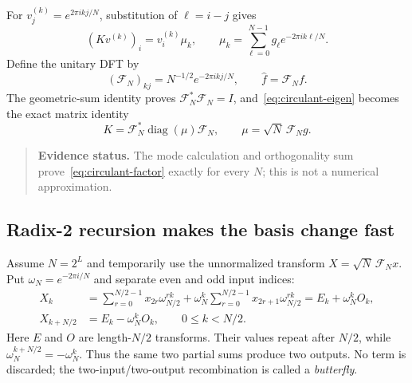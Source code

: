 \documentclass[11pt,a4paper]{article}
\newenvironment{evidence}{\begin{quote}\small\color{muted}\textbf{Evidence status.} }{\end{quote}}
\begin{document}
For $v^{(k)}_j=e^{2\pi ikj/N}$, substitution of $\ell=i-j$ gives
\begin{equation}
 (Kv^{(k)})_i=v^{(k)}_i\mu_k,
 \qquad
 \mu_k=\sum_{\ell=0}^{N-1}g_\ell e^{-2\pi ik\ell/N}.
 \label{eq:circulant-eigen}
\end{equation}
Define the unitary DFT by
\begin{equation}
 (\mathcal F_N)_{kj}=N^{-1/2}e^{-2\pi ikj/N},
 \qquad \widehat f=\mathcal F_Nf.
 \label{eq:unitary-dft}
\end{equation}
The geometric-sum identity proves $\mathcal F_N^*\mathcal F_N=I$, and~\eqref{eq:circulant-eigen} becomes the exact matrix identity
\begin{equation}
 K=\mathcal F_N^*\operatorname{diag}(\mu)\mathcal F_N,
 \qquad \mu=\sqrt N\,\mathcal F_Ng.
 \label{eq:circulant-factor}
\end{equation}
\begin{evidence}
The mode calculation and orthogonality sum prove~\eqref{eq:circulant-factor} exactly for every $N$; this is not a numerical approximation.
\end{evidence}

\subsection{Radix-2 recursion makes the basis change fast}
Assume $N=2^L$ and temporarily use the unnormalized transform $X=\sqrt N\,\mathcal F_Nx$. Put $\omega_N=e^{-2\pi i/N}$ and separate even and odd input indices:
\begin{align}
 X_k&=\sum_{r=0}^{N/2-1}x_{2r}\omega_{N/2}^{rk}
      +\omega_N^k\sum_{r=0}^{N/2-1}x_{2r+1}\omega_{N/2}^{rk}
      =E_k+\omega_N^kO_k,\\
 X_{k+N/2}&=E_k-\omega_N^kO_k,
 \qquad 0\le k<N/2.
 \label{eq:cooley-tukey}
\end{align}
Here $E$ and $O$ are length-$N/2$ transforms. Their values repeat after $N/2$, while $\omega_N^{k+N/2}=-\omega_N^k$. Thus the same two partial sums produce two outputs. No term is discarded; the two-input/two-output recombination is called a \emph{butterfly}.
\end{document}
